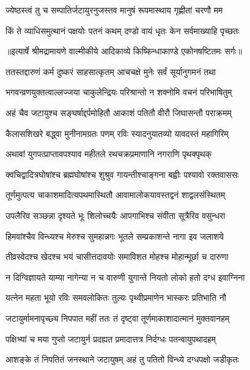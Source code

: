\twolineshloka
{ज्येष्ठस्त्वं तु च सम्पातिर्जटायुरनुजस्तव}
{मानुषं रूपमास्थाय गृह्णीतां चरणौ मम} %

\twolineshloka
{किं ते व्याधिसमुत्थानं पक्षयोः पतनं कथम्}
{दण्डो वायं धृतः केन सर्वमाख्याहि पृच्छतः} %


{॥इत्यार्षे श्रीमद्रामायणे वाल्मीकीये आदिकाव्ये किष्किन्धाकाण्डे एकोनषष्टितमः सर्गः॥}


\twolineshloka
{ततस्तद्दारुणं कर्म दुष्करं साहसात्कृतम्}
{आचचक्षे मुनेः सर्वं सूर्यानुगमनं तथा} %

\twolineshloka
{भगवन्व्रणयुक्तत्वाल्लज्जया चाकुलेन्द्रियः}
{परिश्रान्तो न शक्नोमि वचनं परिभाषितुम्} %

\twolineshloka
{अहं चैव जटायुश्च सङ्घर्षाद्दर्पमोहितौ}
{आकाशं पतितौ वीरौ जिघासन्तौ पराक्रमम्} %

\twolineshloka
{कैलासशिखरे बद्ध्वा मुनीनामग्रतः पणम्}
{रविः स्यादनुयातव्यो यावदस्तं महागिरिम्} %

\twolineshloka
{अथावां युगपत्प्राप्तावपश्याव महीतले}
{रथचक्रप्रमाणानि नगराणि पृथक्पृथक्} %

\twolineshloka
{क्वचिद्वादित्रघोषांश्च ब्रह्मघोषांश्च शुश्रुव}
{गायन्तीश्चाङ्गना बह्वीः पश्यावो रक्तवाससः} %

\twolineshloka
{तूर्णमुत्पत्य चाकाशमादित्यपथमास्थितौ}
{आवामालोकयावस्तद्वनं शाद्वलसंस्थितम्} %

\twolineshloka
{उपलैरिव सञ्छन्ना दृश्यते भूः शिलोच्चयैः}
{आपगाभिश्च संवीता सूत्रैरिव वसुन्धरा} %

\twolineshloka
{हिमवांश्चैव विन्ध्यश्च मेरुश्च सुमहान्नगः}
{भूतले सम्प्रकाशन्ते नागा इव जलाशये} %

\twolineshloka
{तीव्रस्वेदश्च खेदश्च भयं चासीत्तदावयोः}
{समाविशत मोहश्च मोहान्मूर्छा च दारुणा} %

\twolineshloka
{न दिग्विज्ञायते याम्या नागेन्या न च वारुणी}
{युगान्ते नियतो लोको हतो दग्ध इवाग्निना} %

\twolineshloka
{यत्नेन महता भूयो रविः समवलोकितः}
{तुल्यः पृथ्वीप्रमाणेन भास्करः प्रतिभाति नौ} %

\twolineshloka
{जटायुर्मामनापृच्छ्य निपपात महीं ततः}
{तं दृष्ट्वा तूर्णमाकाशादात्मानं मुक्तवानहम्} %

\twolineshloka
{पक्षिभ्यां च मया गुप्तो जटायुर्न प्रदह्यत}
{प्रमादात्तत्र निर्दग्धः पतन्वायुपथादहम्} %

\twolineshloka
{आशङ्के तं निपतितं जनस्थाने जटायुषम्}
{अहं तु पतितो विन्ध्ये दग्धपक्षो जडीकृतः} %

